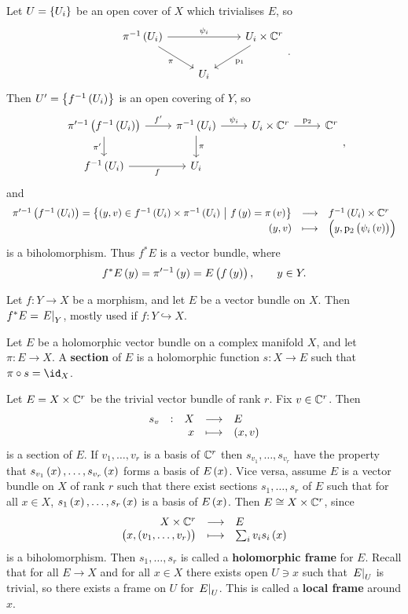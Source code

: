 Let $ U = \cbr{U_i} $ be an open cover of $ X $ which trivialises $ E $, so
$$
\begin{tikzcd}
\pi^{-1}\br{U_i} \arrow{rr}{\psi_i} \arrow[swap]{dr}{\pi} & & U_i \times \CC^r \arrow{dl}{\p_1} \\
& U_i &
\end{tikzcd}.
$$
Then $ U' = \cbr{f^{-1}\br{U_i}} $ is an open covering of $ Y $, so
$$
\begin{tikzcd}
\pi'^{-1}\br{f^{-1}\br{U_i}} \arrow{r}{f'} \arrow[swap]{d}{\pi'} & \pi^{-1}\br{U_i} \arrow{r}{\psi_i} \arrow{d}{\pi} & U_i \times \CC^r \arrow{r}{\p_2} & \CC^r \\
f^{-1}\br{U_i} \arrow[swap]{r}{f} & U_i & &
\end{tikzcd},
$$
and
$$ \function{\pi'^{-1}\br{f^{-1}\br{U_i}} = \cbr{\br{y, v} \in f^{-1}\br{U_i} \times \pi^{-1}\br{U_i} \st f\br{y} = \pi\br{v}}}{f^{-1}\br{U_i} \times \CC^r}{\br{y, v}}{\br{y, \p_2\br{\psi_i\br{v}}}} $$
is a biholomorphism. Thus $ f^*E $ is a vector bundle, where
$$ f^*E\br{y} = \pi'^{-1}\br{y} = E\br{f\br{y}}, \qquad y \in Y. $$

\begin{notation}
Let $ f : Y \to X $ be a morphism, and let $ E $ be a vector bundle on $ X $. Then $ f^*E = \left. E \right|_Y $, mostly used if $ f : Y \hookrightarrow X $.
\end{notation}

\begin{definition}
Let $ E $ be a holomorphic vector bundle on a complex manifold $ X $, and let $ \pi : E \to X $. A \textbf{section} of $ E $ is a holomorphic function $ s : X \to E $ such that $ \pi \circ s = \id_X $.
\end{definition}

\begin{example}
Let $ E = X \times \mathbb{C}^r $ be the trivial vector bundle of rank $ r $. Fix $ v \in \mathbb{C}^r $. Then
$$ \function[s_v]{X}{E}{x}{\br{x, v}} $$
is a section of $ E $. If $ v_1, \dots, v_r $ is a basis of $ \mathbb{C}^r $ then $ s_{v_1}, \dots, s_{v_r} $ have the property that $ s_{v_1}\br{x}, \dots, s_{v_r}\br{x} $ forms a basis of $ E\br{x} $. Vice versa, assume $ E $ is a vector bundle on $ X $ of rank $ r $ such that there exist sections $ s_1, \dots, s_r $ of $ E $ such that for all $ x \in X $, $ s_1\br{x}, \dots, s_r\br{x} $ is a basis of $ E\br{x} $. Then $ E \cong X \times \mathbb{C}^r $, since
$$ \function{X \times \CC^r}{E}{\br{x, \br{v_1, \dots, v_r}}}{\sum_i v_is_i\br{x}} $$
is a biholomorphism. Then $ s_1, \dots, s_r $ is called a \textbf{holomorphic frame} for $ E $. Recall that for all $ E \to X $ and for all $ x \in X $ there exists open $ U \ni x $ such that $ \left. E \right|_U $ is trivial, so there exists a frame on $ U $ for $ \left. E \right|_U $. This is called a \textbf{local frame} around $ x $.
\end{example}

